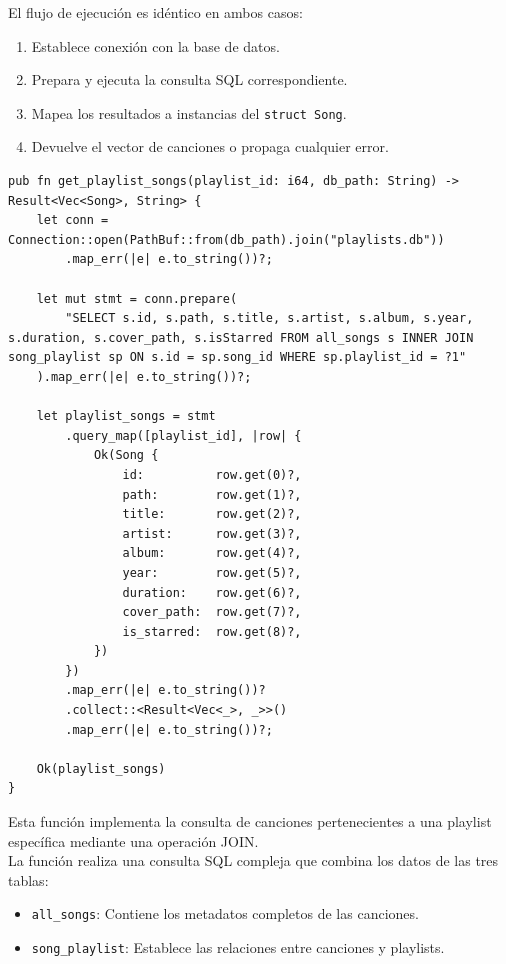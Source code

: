 \documentclass[11pt, a4paper]{article}
\begin{document}
            El flujo de ejecución es idéntico en ambos casos:
            \begin{enumerate}
              \item Establece conexión con la base de datos.
              \item Prepara y ejecuta la consulta SQL correspondiente.
              \item Mapea los resultados a instancias del \texttt{struct Song}.
              \item Devuelve el vector de canciones o propaga cualquier error.
            \end{enumerate}

            \begin{lstlisting}[caption={fn get\_playlist\_songs()}]
pub fn get_playlist_songs(playlist_id: i64, db_path: String) -> Result<Vec<Song>, String> {
    let conn = Connection::open(PathBuf::from(db_path).join("playlists.db"))
        .map_err(|e| e.to_string())?;

    let mut stmt = conn.prepare(
        "SELECT s.id, s.path, s.title, s.artist, s.album, s.year, s.duration, s.cover_path, s.isStarred FROM all_songs s INNER JOIN song_playlist sp ON s.id = sp.song_id WHERE sp.playlist_id = ?1"
    ).map_err(|e| e.to_string())?;

    let playlist_songs = stmt
        .query_map([playlist_id], |row| {
            Ok(Song {
                id:          row.get(0)?,
                path:        row.get(1)?,
                title:       row.get(2)?,
                artist:      row.get(3)?,
                album:       row.get(4)?,
                year:        row.get(5)?,
                duration:    row.get(6)?,
                cover_path:  row.get(7)?,
                is_starred:  row.get(8)?,
            })
        })
        .map_err(|e| e.to_string())?
        .collect::<Result<Vec<_>, _>>()
        .map_err(|e| e.to_string())?;

    Ok(playlist_songs)
}
            \end{lstlisting}

            Esta función implementa la consulta de canciones pertenecientes a una playlist específica mediante una operación JOIN. \\

            La función realiza una consulta SQL compleja que combina los datos de las tres tablas:

            \begin{itemize}
              \item \texttt{all\_songs}: Contiene los metadatos completos de las canciones.
              \item \texttt{song\_playlist}: Establece las relaciones entre canciones y playlists.
            \end{itemize}
\end{document}
